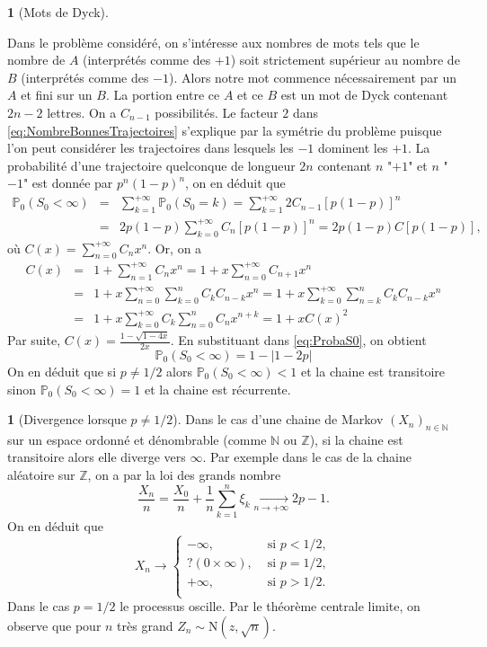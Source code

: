 \documentclass[8pt,notheorems]{beamer}
\def \N{\mathbb N}
\theoremstyle{definition}
\theoremstyle{example}
\newtheorem{example}{\translate{Exemple}}
\newtheorem{remark}{\translate{Remarque}}
\theoremstyle{mystyle}
\theoremstyle{plain}
\begin{document}
\begin{frame}[allowframebreaks]
\begin{example}[Mots de Dyck]
\end{example}
Dans le problème considéré, on s'intéresse aux nombres de mots tels que le nombre de $A$ (interprétés comme des $+1$) soit strictement supérieur au nombre de $B$ (interprétés comme des $-1$). Alors notre mot commence nécessairement par un $A$ et fini sur un $B$. La portion entre ce $A$ et ce $B$ est un mot de Dyck contenant $2n-2$ lettres. On a $C_{n-1}$ possibilités. Le facteur $2$ dans \eqref{eq:NombreBonnesTrajectoires} s'explique par la symétrie du problème puisque l'on peut considérer les trajectoires dans lesquels les $-1$ dominent les $+1$. La probabilité d'une trajectoire quelconque de longueur $2n$ contenant $n$ "$+1$" et $n$ "$-1$" est donnée par $p^{n}(1-p)^{n}$, on en déduit que
\begin{eqnarray}
\mathbb{P}_0(S_0<\infty)&=&\sum_{k=1}^{+\infty}\mathbb{P}_0(S_0=k)=\sum_{k=1}^{+\infty}2C_{n-1}[p(1-p)]^{n}\nonumber\\
&=&2p(1-p)\sum_{k=0}^{+\infty}C_{n}[p(1-p)]^{n}=2p(1-p)C[p(1-p)],\label{eq:ProbaS0}
\end{eqnarray}
où $C(x)=\sum_{n=0}^{+\infty}C_nx^{n}$. Or, on a
\begin{eqnarray*}
C(x)&=&1+\sum_{n=1}^{+\infty}C_nx^{n}=1+x\sum_{n=0}^{+\infty}C_{n+1}x^{n}\\
&=&1+x\sum_{n=0}^{+\infty}\sum_{k=0}^{n}C_kC_{n-k}x^{n}=1+x\sum_{k=0}^{+\infty}\sum_{n=k}^{n}C_kC_{n-k}x^{n}\\
&=&1+x\sum_{k=0}^{+\infty}C_k\sum_{n=0}^{n}C_{n}x^{n+k}=1+xC(x)^{2}
\end{eqnarray*}
Par suite, $C(x)=\frac{1-\sqrt{1-4x}}{2x}$. En substituant dans \eqref{eq:ProbaS0}, on obtient
$$
\mathbb{P}_0(S_0<\infty)=1-|1-2p|
$$
On en déduit que si $p\neq 1/2$ alors $\mathbb{P}_0(S_0<\infty)<1$ et la chaine est transitoire sinon $\mathbb{P}_0(S_0<\infty)=1$ et la chaine est récurrente.
\begin{remark}[Divergence lorsque $p\neq 1/2$]
Dans le cas d'une chaine de Markov $(X_n)_{n\in\N}$ sur un espace ordonné et dénombrable (comme $\N$ ou $\mathbb{Z}$), si la chaine est transitoire alors elle diverge vers $\infty$. Par exemple dans le cas de la chaine aléatoire sur $\mathbb{Z}$, on a par la loi des grands nombre
$$
\frac{X_n}{n}=\frac{X_0}{n}+\frac{1}{n}\sum_{k=1}^{n}\xi_k\underset{n\rightarrow+\infty}{\longrightarrow} 2p-1.
$$
On en déduit que
$$
X_n\rightarrow\begin{cases}
-\infty,&\text{ si }p<1/2,\\
? (0\times \infty),&\text{ si }p=1/2,\\
+\infty,&\text{ si }p>1/2.\\
\end{cases}
$$
Dans le cas $p=1/2$ le processus oscille. Par le théorème centrale limite, on observe que pour $n$ très grand $Z_n\sim\text{N}(z, \sqrt{n})$.

\end{remark}
\end{frame}
\end{document}
